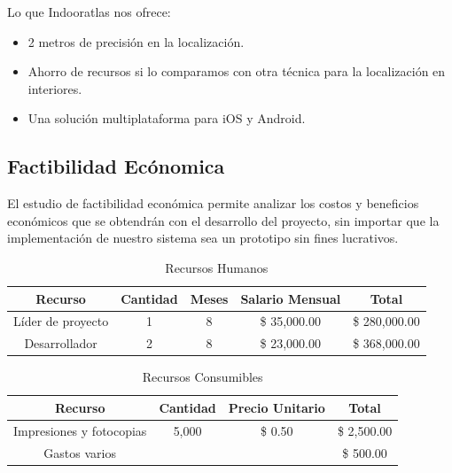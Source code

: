 Lo que Indooratlas nos ofrece:

\begin{itemize}
	\item 2 metros de precisión en la localización.
	\item	Ahorro de recursos si lo comparamos con otra técnica para la localización en interiores.
	\item Una solución multiplataforma para iOS y Android.
\end{itemize}

\subsection{Factibilidad Ecónomica}

El estudio de factibilidad económica permite analizar los costos y beneficios económicos que se obtendrán con el desarrollo del proyecto, sin importar que la implementación de nuestro sistema sea un prototipo sin fines lucrativos. 
\vspace{2cm}
\begin{table}[h]
	\begin{center}
		\begin{tabular}{|c|c|c|c|c|}
			\hline \rowcolor[RGB]{51,153,255} 
			\textcolor{blanco}{\bf Recurso} &
				\textcolor{blanco}{\bf Cantidad} &
				\textcolor{blanco}{\bf Meses} &
				\textcolor{blanco}{\bf Salario Mensual} &
				\textcolor{blanco}{\bf Total} \\
			\hline 
				Líder de proyecto &
				1 &
				8 &
				\$ 35,000.00 &
				\$ 280,000.00 \\
      		\hline \rowcolor[RGB]{240,248,255}
      			Desarrollador &
				2 &
				8 &
				\$ 23,000.00 &
				\$ 368,000.00 \\
      		\hline 
    		\end{tabular}
	\end{center}
	\caption[Recursos Humanos]{Recursos Humanos \cite{salarios}} 
	\label{tab:recursosHumanos}
\end{table}

\begin{table}[h]
	\begin{center}
		\begin{tabular}{|c|c|c|c|}
			\hline \rowcolor[RGB]{51,153,255} 
			\textcolor{blanco}{\bf Recurso} &
				\textcolor{blanco}{\bf Cantidad} &
				\textcolor{blanco}{\bf Precio Unitario} &
				\textcolor{blanco}{\bf Total} \\
			\hline
				Impresiones y fotocopias &
				5,000 &
				\$ 0.50 &
				\$ 2,500.00  \\
      		\hline \rowcolor[RGB]{240,248,255}
      			Gastos varios &
				&
				&
				\$ 500.00 \\
      		\hline 
    		\end{tabular}
	\end{center}
	\caption[Recursos Consumibles]{Recursos Consumibles} 
	\label{tab:recursosConsumibles}
\end{table}

